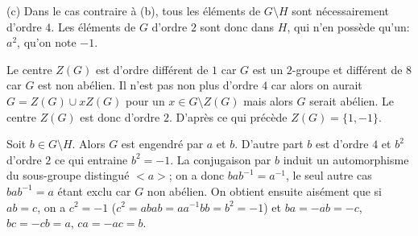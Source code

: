 {{(c) Dans le cas contraire \`a (b), tous les \'el\'ements de $G\setminus H$ sont
n\'ecessairement d'ordre $4$. Les \'el\'ements de $G$ d'ordre $2$ sont donc dans
$H$, qui n'en poss\`ede qu'un: $a^2$, qu'on note $-1$.

\hskip 5mm Le centre $Z(G)$ est d'ordre diff\'erent de $1$ car $G$ est un
$2$-groupe et diff\'erent de $8$ car $G$ est non ab\'elien. Il n'est pas non plus
d'ordre $4$ car alors on aurait $G=Z(G) \cup x Z(G)$ pour un $x\in G\setminus
Z(G)$ mais alors $G$ serait ab\'elien. Le centre $Z(G)$ est donc d'ordre $2$.
D'apr\`es ce qui pr\'ec\`ede $Z(G)=\{1,-1\}$. 

\hskip 5mm Soit $b\in G\setminus H$. Alors $G$ est engendr\'e par
$a$ et $b$. D'autre part $b$ est d'ordre $4$ et $b^2$ d'ordre $2$ ce qui
entraine $b^2=-1$. La conjugaison par $b$ induit un automorphisme du sous-groupe
distingu\'e $<a>$; on a donc $bab^{-1} = a^{-1}$, le seul autre cas $bab^{-1} = a$
\'etant exclu car $G$ non ab\'elien. On obtient ensuite ais\'ement que si $ab=c$, 
on a $c^2=-1$ ($c^2=abab=aa^{-1}bb=b^2=-1$) et $ba=-ab=-c$, $bc=-cb=a$,
$ca=-ac=b$.
}
}
